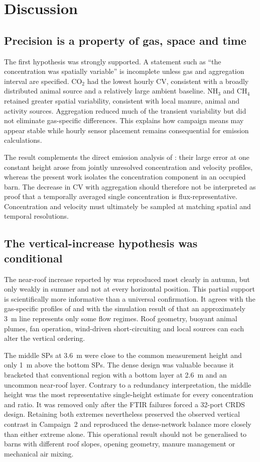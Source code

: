 ﻿\documentclass[12pt,a4paper]{article}
\begin{document}
\section{Discussion}
\subsection{Precision is a property of gas, space and time}
The first hypothesis was strongly supported. A statement such as ``the concentration was spatially variable'' is incomplete unless gas and aggregation interval are specified. \(\mathrm{CO_2}\) had the lowest hourly CV, consistent with a broadly distributed animal source and a relatively large ambient baseline. \(\mathrm{NH_3}\) and \(\mathrm{CH_4}\) retained greater spatial variability, consistent with local manure, animal and activity sources. Aggregation reduced much of the transient variability but did not eliminate gas-specific differences. This explains how campaign means may appear stable while hourly sensor placement remains consequential for emission calculations.

The result complements the direct emission analysis of \citet{Janke2020}: their large error at one constant height arose from jointly unresolved concentration and velocity profiles, whereas the present work isolates the concentration component in an occupied barn. The decrease in CV with aggregation should therefore not be interpreted as proof that a temporally averaged single concentration is flux-representative. Concentration and velocity must ultimately be sampled at matching spatial and temporal resolutions.

\subsection{The vertical-increase hypothesis was conditional}
The near-roof increase reported by \citet{Sahu2023} was reproduced most clearly in autumn, but only weakly in summer and not at every horizontal position. This partial support is scientifically more informative than a universal confirmation. It agrees with the gas-specific profiles of \citet{Durso2024} and with the simulation result of \citet{Doumbia2021} that an approximately \SI{3}{m} line represents only some flow regimes. Roof geometry, buoyant animal plumes, fan operation, wind-driven short-circuiting and local sources can each alter the vertical ordering.

The middle SPs at \SI{3.6}{m} were close to the common measurement height and only \SI{1}{m} above the bottom SPs. The dense design was valuable because it bracketed that conventional region with a bottom layer at \SI{2.6}{m} and an uncommon near-roof layer. Contrary to a redundancy interpretation, the middle height was the most representative single-height estimate for every concentration and ratio. It was removed only after the FTIR failures forced a 32-port CRDS design. Retaining both extremes nevertheless preserved the observed vertical contrast in Campaign~2 and reproduced the dense-network balance more closely than either extreme alone. This operational result should not be generalised to barns with different roof slopes, opening geometry, manure management or mechanical air mixing.
\end{document}
